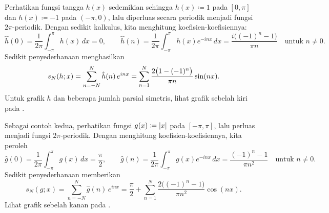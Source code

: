 \begin{example}
Perhatikan fungsi tangga $h(x)$ sedemikian sehingga $h(x) \coloneqq 1$
pada $[0,\pi]$ dan $h(x) \coloneqq -1$ pada $(-\pi,0)$, lalu diperluas secara periodik menjadi
fungsi $2\pi$-periodik. Dengan sedikit kalkulus,
kita menghitung koefisien-koefisiennya:
\begin{equation*}
\hat{h}(0)
=
\frac{1}{2\pi} \int_{-\pi}^\pi h(x) \, dx = 0,
\qquad
\hat{h}(n)
=
\frac{1}{2\pi} \int_{-\pi}^\pi h(x) e^{-inx} \, dx
=
\frac{i\bigl( (-1)^n-1 \bigr)}{\pi n} \quad \text{untuk } n \neq 0 .
\end{equation*}
Sedikit penyederhanaan menghasilkan
\begin{equation*}
s_N(h;x) =
\sum_{n=-N}^N \hat{h}(n) \,e^{inx} 
=
\sum_{n=1}^N \frac{2\bigl(1-(-1)^n\bigr)}{\pi n} \sin(n x) .
\avoidbreak
\end{equation*}
Untuk grafik $h$ dan beberapa jumlah parsial simetris, lihat grafik sebelah kiri
pada .

Sebagai contoh kedua, perhatikan fungsi $g(x) \coloneqq \lvert {x} \rvert$
pada $[-\pi,\pi]$, lalu perluas menjadi fungsi $2\pi$-periodik.
Dengan menghitung koefisien-koefisiennya, kita peroleh
\begin{equation*}
\hat{g}(0)
=
\frac{1}{2\pi} \int_{-\pi}^\pi g(x) \, dx = \frac{\pi}{2},
\qquad
\hat{g}(n)
=
\frac{1}{2\pi} \int_{-\pi}^\pi g(x) e^{-inx} \, dx
=
\frac{(-1)^n-1}{\pi n^2} \quad \text{untuk } n \neq 0 .
\end{equation*}
Sedikit penyederhanaan memberikan
\begin{equation*}
s_N(g;x) =
\sum_{n=-N}^N \hat{g}(n) \,e^{inx} 
=
\frac{\pi}{2} + 
\sum_{n=1}^N \frac{2\bigl((-1)^n-1\bigr)}{\pi n^2} \cos(n x) .
\end{equation*}
Lihat grafik sebelah kanan pada .


\end{example}
